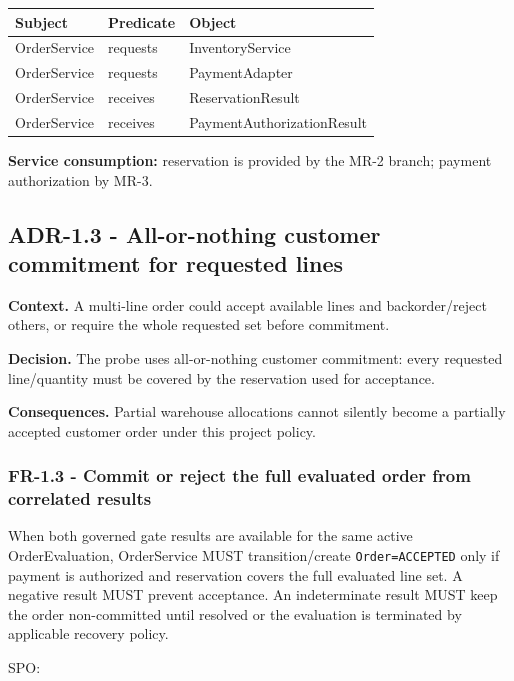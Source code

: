 \documentclass[
  10pt,
]{article}
\begin{document}
\begin{longtable}[]{@{}lll@{}}
\toprule\noalign{}
Subject & Predicate & Object \\
\midrule\noalign{}
\endhead
\bottomrule\noalign{}
\endlastfoot
OrderService & requests & InventoryService \\
OrderService & requests & PaymentAdapter \\
OrderService & receives & ReservationResult \\
OrderService & receives & PaymentAuthorizationResult \\
\end{longtable}

\textbf{Service consumption:} reservation is provided by the MR-2
branch; payment authorization by MR-3.

\subsection{ADR-1.3 - All-or-nothing customer commitment for requested
lines}\label{adr-13---all-or-nothing-customer-commitment-for-requested-lines}

\textbf{Context.} A multi-line order could accept available lines and
backorder/reject others, or require the whole requested set before
commitment.

\textbf{Decision.} The probe uses all-or-nothing customer commitment:
every requested line/quantity must be covered by the reservation used
for acceptance.

\textbf{Consequences.} Partial warehouse allocations cannot silently
become a partially accepted customer order under this project policy.

\subsubsection{FR-1.3 - Commit or reject the full evaluated order from
correlated
results}\label{fr-13---commit-or-reject-the-full-evaluated-order-from-correlated-results}

When both governed gate results are available for the same active
OrderEvaluation, OrderService MUST transition/create
\texttt{Order=ACCEPTED} only if payment is authorized and reservation
covers the full evaluated line set. A negative result MUST prevent
acceptance. An indeterminate result MUST keep the order non-committed
until resolved or the evaluation is terminated by applicable recovery
policy.

SPO:
\end{document}
